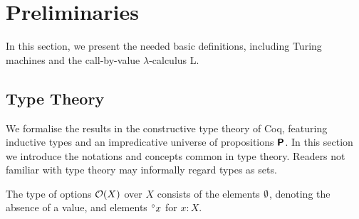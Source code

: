 
\newcommand*{\movel}{\textsf{L}}
\newcommand*{\mover}{\textsf{R}}
\newcommand*{\moven}{\textsf{N}}

\newcommand*{\tmleft}[1]{\textsf{left}~#1}
\newcommand*{\tmright}[1]{\textsf{right}~#1}
\newcommand*{\tmcurrent}[1]{\textsf{current}~#1}

\newcommand{\finType}{\textsf{finType}}
\newcommand{\eqType}{\textsf{eqType}}

\newcommand{\findex}[1]{\ensuremath{\textsf{index}~#1}}

\chapter{Preliminaries}\label{chap:preliminaries}
In this section, we present the needed basic definitions, including Turing machines and the call-by-value $\lambda$-calculus L.

\section{Type Theory}
We formalise the results in the constructive type theory of Coq, featuring inductive types and an impredicative universe of propositions $\textsf{\bfseries P}$. In this section we introduce the notations and concepts common in type theory. Readers not familiar with type theory may informally regard types as sets.

The type of options $\mathcal{O}{(X)}$ over $X$ consists of the elements $\emptyset$, denoting the absence of a value, and elements $\prescript{\circ}{}x$ for $x : X$.

